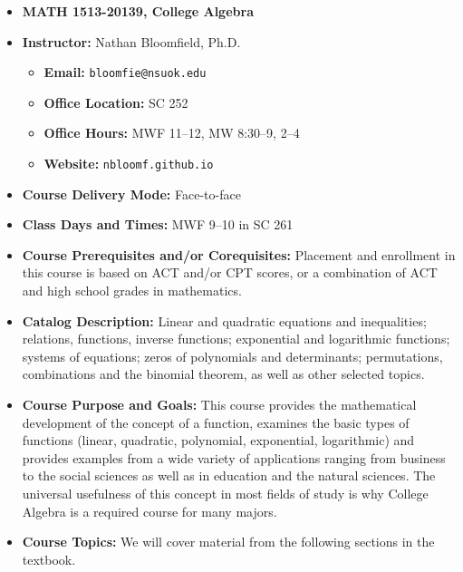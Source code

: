 \documentclass{article}
\begin{document}
\begin{itemize}
\item[] \textbf{\Large MATH 1513-20139, College Algebra}

\item \textbf{Instructor:} Nathan Bloomfield, Ph.D.
\begin{itemize}
\item[] \textbf{Email:} \texttt{bloomfie@nsuok.edu}
\item[] \textbf{Office Location:} SC 252 
\item[] \textbf{Office Hours:} MWF 11--12, MW 8:30--9, 2--4
\item[] \textbf{Website:} \texttt{nbloomf.github.io}
\end{itemize}


\item \textbf{Course Delivery Mode:} Face-to-face


\item \textbf{Class Days and Times:} MWF 9--10 in SC 261


\item \textbf{Course Prerequisites and/or Corequisites:} Placement and enrollment in this course is based on ACT and/or CPT scores, or a combination of ACT and high school grades in mathematics.


\item \textbf{Catalog Description:} Linear and quadratic equations and inequalities; relations, functions, inverse functions; exponential and logarithmic functions; systems of equations; zeros of polynomials and determinants; permutations, combinations and the binomial theorem, as well as other selected topics.


\item \textbf{Course Purpose and Goals:} This course provides the mathematical development of the concept of a function, examines the basic types of functions (linear, quadratic, polynomial, exponential, logarithmic) and provides examples from a wide variety of applications ranging from business to the social sciences as well as in education and the natural sciences. The universal usefulness of this concept in most fields of study is why College Algebra is a required course for many majors.


\item \textbf{Course Topics:} We will cover material from the following sections in the textbook.



\end{itemize}
\end{document}
